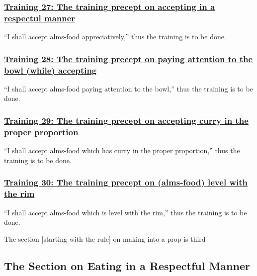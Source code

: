 \subsubsection*{\hyperref[sekh27]{Training 27: The training precept on accepting in a respectul manner}}
\label{training27}
``I shall accept alms-food appreciatively,'' thus the training is to be done.



\subsubsection*{\hyperref[sekh28]{Training 28: The training precept on paying attention to the bowl (while) accepting}}
\label{training28}
``I shall accept alms-food paying attention to the bowl,'' thus the training is to be done.



\subsubsection*{\hyperref[sekh29]{Training 29: The training precept on accepting curry in the proper proportion}}
\label{training29}
``I shall accept alms-food which has curry in the proper proportion,'' thus the training is to be done.



\subsubsection*{\hyperref[sekh30]{Training 30: The training precept on (alms-food) level with the rim}}
\label{training30}
``I shall accept alms-food which is level with the rim,'' thus the training is to be done.

\begin{center}
	The section [starting with the rule] on making into a prop is third
\end{center}



\setsubsecheadstyle{\subsectionFmt}
\subsection{The Section on Eating in a Respectful Manner}
\label{trainings-vagga4}
\ifafiveversion\vspace{0.2cm}\fi
\ifninebythirteenversion\vspace{0.15cm}\fi

